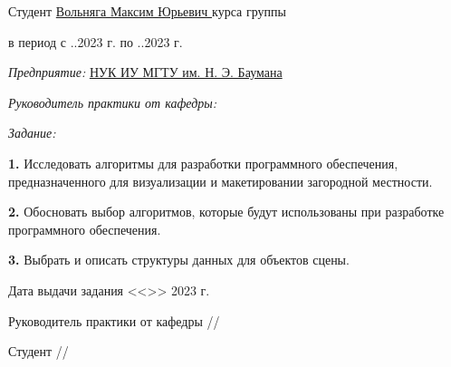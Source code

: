 \fontsize{14pt}{14pt}\selectfont

\noindent Студент \uline{\hfill Вольняга Максим Юрьевич \hfill}  курса группы 

\vspace{0.3cm}

\noindent в период с ..2023 г. по ..2023 г.

\vspace{0.3cm}

\noindent \textit{Предприятие:} \uline{\hfill НУК ИУ МГТУ им. Н. Э. Баумана \hfill}

\vspace{0.3cm}






\noindent \textit{Руководитель практики от кафедры:}

\noindent {}

\vspace{0.3cm}

\noindent \textit{Задание:}

\noindent \textbf{1.} Исследовать алгоритмы для разработки программного обеспечения, предназначенного для визуализации и макетировании загородной местности.

\noindent \textbf{2.} Обосновать выбор алгоритмов,
которые будут использованы при разработке программного обеспечения.

\noindent \textbf{3.} Выбрать и описать структуры данных для объектов сцены.

\vfill

\noindent Дата выдачи задания <<>> 2023 г.

\vspace{1cm}



\noindent Руководитель практики от кафедры \hfill \ulinetext[2cm]{}{}//

\vspace{0.3cm}

\noindent Студент \hfill \ulinetext[2cm]{}{}//

\vfill

